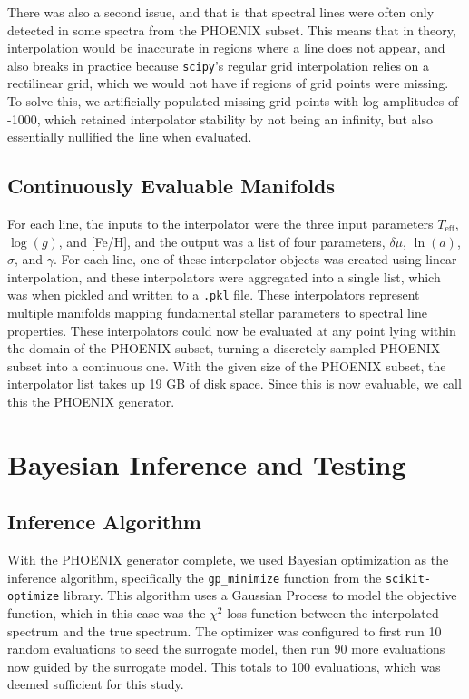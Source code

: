 \documentclass[twocolumn]{aastex631}
\begin{document}
There was also a second issue, and that is that spectral lines were often
only detected in some spectra from the PHOENIX subset. This means that in 
theory, interpolation would be inaccurate in regions where a line does not 
appear, and also breaks in practice because \texttt{scipy}'s regular grid
interpolation relies on a rectilinear grid, which we would not have if
regions of grid points were missing. To solve this, we artificially
populated missing grid points with log-amplitudes of -1000, which retained
interpolator stability by not being an infinity, but also essentially 
nullified the line when evaluated.

\subsection{Continuously Evaluable Manifolds}
For each line, the inputs to the interpolator were the three input parameters $T_{\mathrm{eff}}$,
$\log(g)$, and [Fe/H], and the output was a list of four parameters, 
$\delta\mu$, $\ln(a)$, $\sigma$, and $\gamma$. For each line, one of these 
interpolator objects was created using linear interpolation, and these 
interpolators were aggregated into a single list, which was when pickled 
and written to a \texttt{.pkl} file. These interpolators represent multiple 
manifolds mapping fundamental stellar parameters to spectral line properties. 
These interpolators could now be evaluated at any point lying within the 
domain of the PHOENIX subset, turning a discretely sampled PHOENIX subset 
into a continuous one. With the given size of the PHOENIX subset, the 
interpolator list takes up 19 GB of disk space. Since this is now evaluable,
we call this the PHOENIX generator.

\section{Bayesian Inference and Testing}
\subsection{Inference Algorithm}
With the PHOENIX generator complete, we used Bayesian optimization as the
inference algorithm, specifically the \texttt{gp\_minimize} function from
the \texttt{scikit-optimize} library. This algorithm uses a Gaussian Process
to model the objective function, which in this case was the $\chi^2$ loss
function between the interpolated spectrum and the true spectrum. The 
optimizer was configured to first run 10 random evaluations to seed the
surrogate model, then run 90 more evaluations now guided by the surrogate
model. This totals to 100 evaluations, which was deemed sufficient for this
study.
\end{document}
